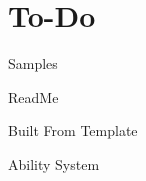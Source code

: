 \chapter{To-\/\+Do }
\hypertarget{md__documentation_2_to-_do}{}\label{md__documentation_2_to-_do}

\begin{DoxyItemize}
\item Samples
\item Read\+Me
\item Built From Template
\item Ability System 
\end{DoxyItemize}